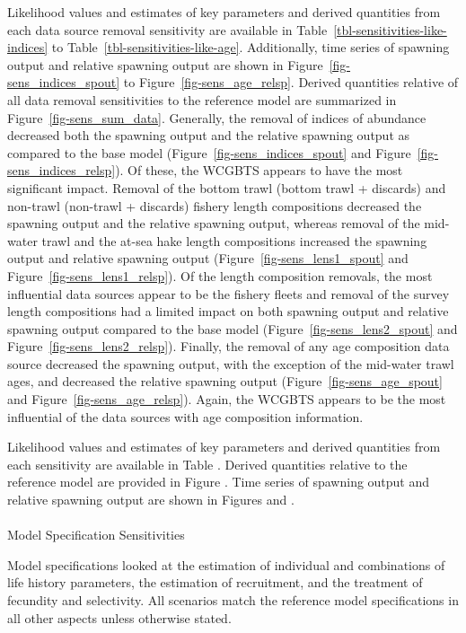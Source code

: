 \documentclass[
]{scrartcl}
\makeatletter
\let\oldparagraph\paragraph
\renewcommand{\paragraph}{
    \@ifstar
      \xxxParagraphStar
      \xxxParagraphNoStar
  }
\newcommand{\xxxParagraphStar}[1]{\oldparagraph*{#1}\mbox{}}
\newcommand{\xxxParagraphNoStar}[1]{\oldparagraph{#1}\mbox{}}
\makeatother
\begin{document}
Likelihood values and estimates of key parameters and derived quantities
from each data source removal sensitivity are available in
Table~\ref{tbl-sensitivities-like-indices} to
Table~\ref{tbl-sensitivities-like-age}. Additionally, time series of
spawning output and relative spawning output are shown in
Figure~\ref{fig-sens_indices_spout} to Figure~\ref{fig-sens_age_relsp}.
Derived quantities relative of all data removal sensitivities to the
reference model are summarized in Figure~\ref{fig-sens_sum_data}.
Generally, the removal of indices of abundance decreased both the
spawning output and the relative spawning output as compared to the base
model (Figure~\ref{fig-sens_indices_spout} and
Figure~\ref{fig-sens_indices_relsp}). Of these, the WCGBTS appears to
have the most significant impact. Removal of the bottom trawl (bottom
trawl + discards) and non-trawl (non-trawl + discards) fishery length
compositions decreased the spawning output and the relative spawning
output, whereas removal of the mid-water trawl and the at-sea hake
length compositions increased the spawning output and relative spawning
output (Figure~\ref{fig-sens_lens1_spout} and
Figure~\ref{fig-sens_lens1_relsp}). Of the length composition removals,
the most influential data sources appear to be the fishery fleets and
removal of the survey length compositions had a limited impact on both
spawning output and relative spawning output compared to the base model
(Figure~\ref{fig-sens_lens2_spout} and
Figure~\ref{fig-sens_lens2_relsp}). Finally, the removal of any age
composition data source decreased the spawning output, with the
exception of the mid-water trawl ages, and decreased the relative
spawning output (Figure~\ref{fig-sens_age_spout} and
Figure~\ref{fig-sens_age_relsp}). Again, the WCGBTS appears to be the
most influential of the data sources with age composition information.

Likelihood values and estimates of key parameters and derived quantities
from each sensitivity are available in Table . Derived quantities
relative to the reference model are provided in Figure . Time series of
spawning output and relative spawning output are shown in Figures and .

\paragraph{Model Specification Sensitivities}\label{senstivities}

Model specifications looked at the estimation of individual and
combinations of life history parameters, the estimation of recruitment,
and the treatment of fecundity and selectivity. All scenarios match the
reference model specifications in all other aspects unless otherwise
stated.
\end{document}
